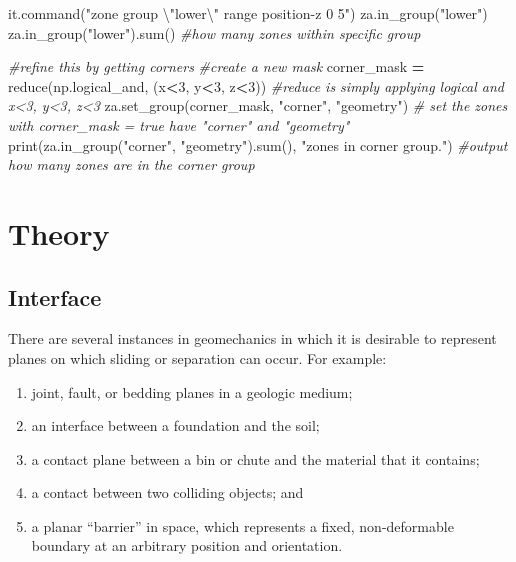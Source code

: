 \documentclass[a4paper, nobind]{templates/ociamthesis}
\providecommand{\tightlist}{%
  \setlength{\itemsep}{0pt}\setlength{\parskip}{0pt}}
\newenvironment{Shaded}{\begin{snugshade}}{\end{snugshade}}
\newcommand{\BuiltInTok}[1]{#1}
\newcommand{\CharTok}[1]{\textcolor[rgb]{0.31,0.60,0.02}{#1}}
\newcommand{\CommentTok}[1]{\textcolor[rgb]{0.56,0.35,0.01}{\textit{#1}}}
\newcommand{\DecValTok}[1]{\textcolor[rgb]{0.00,0.00,0.81}{#1}}
\newcommand{\NormalTok}[1]{#1}
\newcommand{\OperatorTok}[1]{\textcolor[rgb]{0.81,0.36,0.00}{\textbf{#1}}}
\newcommand{\StringTok}[1]{\textcolor[rgb]{0.31,0.60,0.02}{#1}}
\renewenvironment{Shaded}
{
  \vspace{10pt}%
  \begin{snugshade}%
}{%
  \end{snugshade}%
  \vspace{8pt}%
}
\begin{document}
\begin{Shaded}
\begin{Highlighting}[]
\NormalTok{it.command(}\StringTok{"zone group }\CharTok{\textbackslash{}"}\StringTok{lower}\CharTok{\textbackslash{}"}\StringTok{ range position{-}z 0 5"}\NormalTok{)}
\NormalTok{za.in\_group(}\StringTok{"lower"}\NormalTok{)}
\NormalTok{za.in\_group(}\StringTok{"lower"}\NormalTok{).}\BuiltInTok{sum}\NormalTok{() }\CommentTok{\#how many zones within specific group}

\CommentTok{\#refine this by getting corners}
\CommentTok{\#create a new mask}
\NormalTok{corner\_mask }\OperatorTok{=} \BuiltInTok{reduce}\NormalTok{(np.logical\_and, (x}\OperatorTok{\textless{}}\DecValTok{3}\NormalTok{, y}\OperatorTok{\textless{}}\DecValTok{3}\NormalTok{, z}\OperatorTok{\textless{}}\DecValTok{3}\NormalTok{)) }\CommentTok{\#reduce is simply applying logical and x\textless{}3, y\textless{}3, z\textless{}3}
\NormalTok{za.set\_group(corner\_mask, }\StringTok{"corner"}\NormalTok{, }\StringTok{"geometry"}\NormalTok{) }\CommentTok{\# set the zones with corner\_mask = true have "corner" and "geometry"}
\BuiltInTok{print}\NormalTok{(za.in\_group(}\StringTok{"corner"}\NormalTok{, }\StringTok{"geometry"}\NormalTok{).}\BuiltInTok{sum}\NormalTok{(), }\StringTok{"zones in corner group."}\NormalTok{) }\CommentTok{\#output how many zones are in the corner group}
\end{Highlighting}
\end{Shaded}

\newpage

\hypertarget{theory}{%
\chapter{Theory}\label{theory}}

\hypertarget{interface}{%
\section{Interface}\label{interface}}

There are several instances in geomechanics in which it is desirable to represent planes on which sliding or separation can occur. For example:\\

\begin{enumerate}
\def\labelenumi{\arabic{enumi}.}
\tightlist
\item
  joint, fault, or bedding planes in a geologic medium;
\item
  an interface between a foundation and the soil;
\item
  a contact plane between a bin or chute and the material that it contains;
\item
  a contact between two colliding objects; and
\item
  a planar ``barrier'' in space, which represents a fixed, non-deformable boundary at an arbitrary position and orientation.\\
\end{enumerate}
\end{document}

